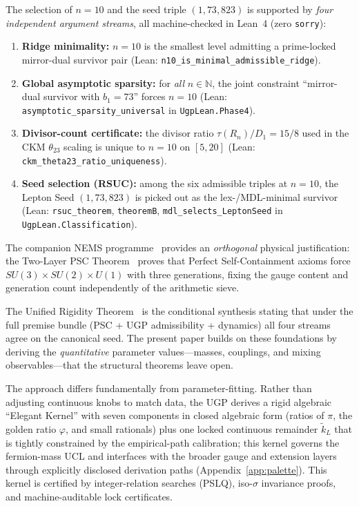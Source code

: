 \documentclass[11pt]{article}
\theoremstyle{remark}
\begin{document}
The selection of $n{=}10$ and the seed triple $(1,73,823)$ is supported by \emph{four independent argument streams}, all machine-checked in Lean~4 (zero \texttt{sorry}):
\begin{enumerate}[label=(\alph*),leftmargin=1.6em,itemsep=0.2em,topsep=0.3em]
  \item \textbf{Ridge minimality:} $n{=}10$ is the smallest level admitting a prime-locked mirror-dual survivor pair (Lean: \texttt{n10\_is\_minimal\_admissible\_ridge}).
  \item \textbf{Global asymptotic sparsity:} for \emph{all} $n \in \mathbb{N}$, the joint constraint ``mirror-dual survivor with $b_1{=}73$'' forces $n{=}10$ (Lean: \texttt{asymptotic\_sparsity\_universal} in \texttt{UgpLean.Phase4}).
  \item \textbf{Divisor-count certificate:} the divisor ratio $\tau(R_n)/D_1 = 15/8$ used in the CKM $\theta_{23}$ scaling is unique to $n{=}10$ on $[5,20]$ (Lean: \texttt{ckm\_theta23\_ratio\_uniqueness}).
  \item \textbf{Seed selection (RSUC):} among the six admissible triples at $n{=}10$, the Lepton Seed $(1,73,823)$ is picked out as the lex-/MDL-minimal survivor (Lean: \texttt{rsuc\_theorem}, \texttt{theoremB}, \texttt{mdl\_selects\_LeptonSeed} in \texttt{UgpLean.Classification}).
\end{enumerate}

The companion NEMS programme~\cite{SpivackNEMSHub} provides an \emph{orthogonal} physical justification: the Two-Layer PSC Theorem~\cite{SpivackNEMS05} proves that Perfect Self-Containment axioms force $SU(3) \times SU(2) \times U(1)$ with three generations, fixing the gauge content and generation count independently of the arithmetic sieve.

The Unified Rigidity Theorem~\cite{SpivackUnifiedRigidity} is the conditional synthesis stating that under the full premise bundle (PSC + UGP admissibility + dynamics) all four streams agree on the canonical seed.
The present paper builds on these foundations by deriving the \emph{quantitative} parameter values---masses, couplings, and mixing observables---that the structural theorems leave open.

The approach differs fundamentally from parameter-fitting.
Rather than adjusting continuous knobs to match data, the UGP derives a rigid algebraic ``Elegant Kernel'' with seven components in closed algebraic form (ratios of $\pi$, the golden ratio $\varphi$, and small rationals) plus one locked continuous remainder $\tilde{k}_L$ that is tightly constrained by the empirical-path calibration; this kernel governs the fermion-mass UCL and interfaces with the broader gauge and extension layers through explicitly disclosed derivation paths (Appendix~\ref{app:palette}).
This kernel is certified by integer-relation searches (PSLQ), iso-$\sigma$ invariance proofs, and machine-auditable lock certificates.
\end{document}
